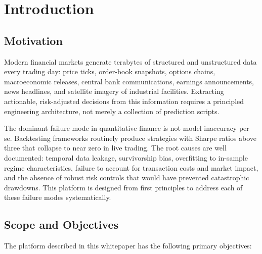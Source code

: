 \documentclass[12pt,openany]{book}
\numberwithin{equation}{chapter}
\theoremstyle{plain}
\theoremstyle{definition}
\theoremstyle{remark}
\begin{document}
\chapter{Introduction}

\section{Motivation}

Modern financial markets generate terabytes of structured and unstructured
data every trading day: price ticks, order-book snapshots, options chains,
macroeconomic releases, central bank communications, earnings announcements,
news headlines, and satellite imagery of industrial facilities. Extracting
actionable, risk-adjusted decisions from this information requires a
principled engineering architecture, not merely a collection of prediction
scripts.

The dominant failure mode in quantitative finance is not model inaccuracy
per se. Backtesting frameworks routinely produce strategies with Sharpe
ratios above three that collapse to near zero in live trading. The root
causes are well documented: temporal data leakage, survivorship bias,
overfitting to in-sample regime characteristics, failure to account for
transaction costs and market impact, and the absence of robust risk
controls that would have prevented catastrophic drawdowns. This platform
is designed from first principles to address each of these failure modes
systematically.

\section{Scope and Objectives}

The platform described in this whitepaper has the following primary objectives:
\end{document}
